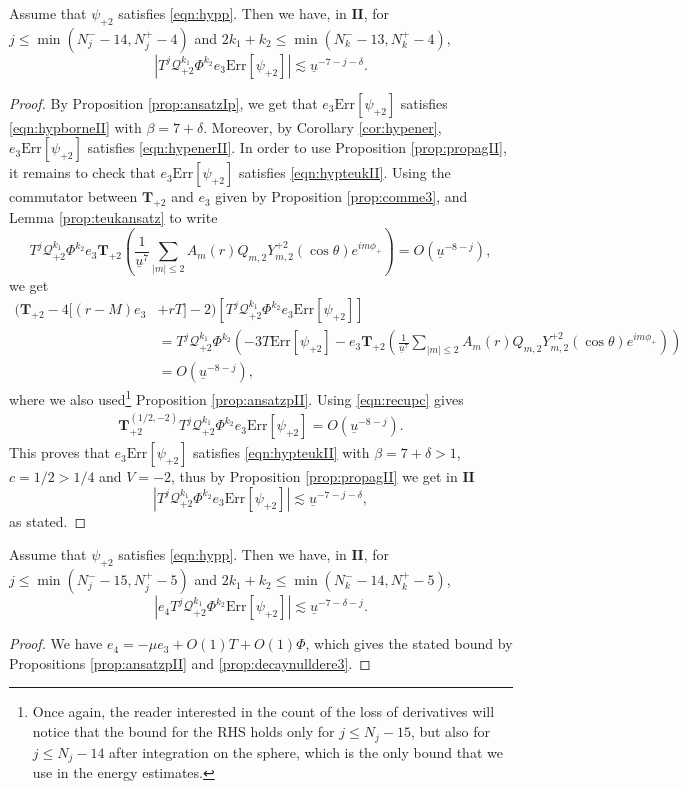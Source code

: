 \documentclass[reqno]{amsart}
\numberwithin{equation}{section}
\newcommand{\mcq}{\mathcal{Q}}
\newcommand{\ubar}{{\underline{u}}}
\newcommand{\errp}{\mathrm{Err}[\Psip]}
\newcommand{\carterp}{\mcq_{+2}}
\newcommand{\teuk}{\mathbf{T}}
\newcommand{\deux}{\mathbf{II}}
\newcommand{\Psip}{\psi_{+2}}
\newcommand{\sfrak}{2}
\newcommand{\ansatzp}{\frac{1}{\ubar^{7}}\sum_{|m|\leq2}A_m(r)Q_{m,\sfrak}Y_{m,\sfrak}^{+\sfrak}(\cos\theta)e^{im\phi_{+}}}
\theoremstyle{plain}
\theoremstyle{definition}
\theoremstyle{remark}
\numberwithin{equation}{section}
\begin{document}
\begin{prop}\label{prop:decaynulldere3}
    Assume that $\Psip$ satisfies \eqref{eqn:hypp}. Then we have, in $\deux$, for $j\leq \min(N_j^--14,N_j^+-4)$ and $2k_1+k_2\leq \min(N_k^--13,N_k^+-4)$,
$$|T^j\mcq_{+2}^{k_1}\Phi^{k_2}e_3\errp|\lesssim\ubar^{-7-j-\delta}.$$
\end{prop}
\begin{proof}
By Proposition \ref{prop:ansatzIp}, we get that $e_3\errp$ satisfies \eqref{eqn:hypborneII} with $\beta=7+\delta$. Moreover, by Corollary \ref{cor:hypener}, $e_3\errp$ satisfies \eqref{eqn:hypenerII}. In order to use Proposition \ref{prop:propagII}, it remains to check that $e_3\errp$ satisfies \eqref{eqn:hypteukII}. Using the commutator between $\teuk_{+2}$ and $e_3$ given by Proposition \ref{prop:comme3}, and Lemma \ref{prop:teukansatz} to write
$$T^j\carterp^{k_1}\Phi^{k_2}e_3\teuk_{+2}\left(\ansatzp\right)=O(\ubar^{-8-j}),$$
we get
\begin{align*}
    \Big(\teuk_{+2}-4[(r-M)e_3&+rT]-2\Big)[T^j\carterp^{k_1}\Phi^{k_2}e_3\errp]\\
    &=T^j\carterp^{k_1}\Phi^{k_2}\left(-3T\errp-e_3\teuk_{+2}\left(\ansatzp\right)\right)\\
    &=O(\ubar^{-8-j}),
\end{align*}
where we also used\footnote{Once again, the reader interested in the count of the loss of derivatives will notice that the bound for the RHS holds only for $j\leq N_j-15$, but also for $j\leq N_j-14$ after integration on the sphere, which is the only bound that we use in the energy estimates.} Proposition \ref{prop:ansatzpII}. Using \eqref{eqn:recupc} gives
\begin{align*}
    \teuk_{+2}^{(1/2,-2)}T^j\carterp^{k_1}\Phi^{k_2}e_3\errp=O(\ubar^{-8-j}).
\end{align*}
This proves that $e_3\errp$ satisfies \eqref{eqn:hypteukII} with $\beta=7+\delta>1$, $c=1/2>1/4$ and $V=-2$, thus by Proposition \ref{prop:propagII} we get in $\deux$
$$|T^j\mcq_{+2}^{k_1}\Phi^{k_2}e_3\errp|\lesssim\ubar^{-7-j-\delta},$$
as stated.
\end{proof}
\begin{cor}\label{prop:decaynullder}
    Assume that $\Psip$ satisfies \eqref{eqn:hypp}. Then we have, in $\deux$, for $j\leq \min(N_j^--15,N_j^+-5)$ and $2k_1+k_2\leq \min(N_k^--14,N_k^+-5)$,
$$|e_4 T^j\mcq_{+2}^{k_1}\Phi^{k_2}\errp|\lesssim\ubar^{-7-\delta-j}.$$
\end{cor}
\begin{proof}
    We have $e_4=-\mu e_3+O(1)T+O(1)\Phi$, which gives the stated bound by Propositions \ref{prop:ansatzpII} and \ref{prop:decaynulldere3}. 
\end{proof}
\end{document}
